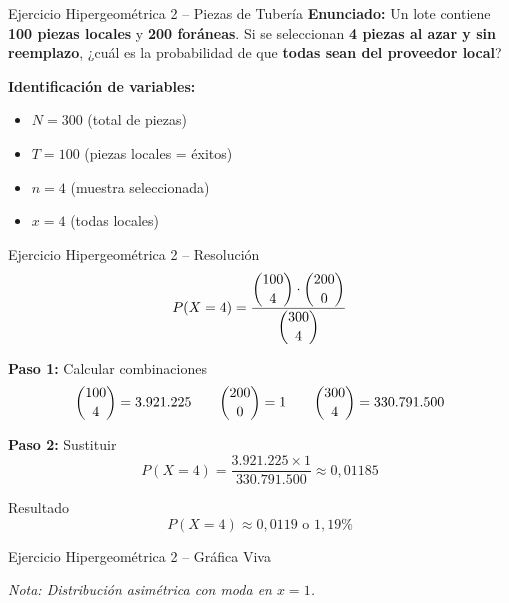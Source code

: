 \documentclass[10pt]{beamer}
\begin{document}
\begin{frame}{Ejercicio Hipergeométrica 2 -- Piezas de Tubería}
\textbf{Enunciado:}
\justifying
Un lote contiene \textbf{100 piezas locales} y \textbf{200 foráneas}. Si se seleccionan \textbf{4 piezas al azar y sin reemplazo}, ¿cuál es la probabilidad de que \textbf{todas sean del proveedor local}?

\vspace{0.2cm}
\textbf{Identificación de variables:}
\begin{itemize}
    \item $N = 300$ (total de piezas)
    \item $T = 100$ (piezas locales = éxitos)
    \item $n = 4$ (muestra seleccionada)
    \item $x = 4$ (todas locales)
\end{itemize}
\end{frame}

\begin{frame}{Ejercicio Hipergeométrica 2 -- Resolución}
\[
P(X=4) = \frac{\dbinom{100}{4} \cdot \dbinom{200}{0}}{\dbinom{300}{4}}
\]

\textbf{Paso 1:} Calcular combinaciones
\[
\dbinom{100}{4} = 3.921.225 \qquad \dbinom{200}{0} = 1 \qquad \dbinom{300}{4} = 330.791.500
\]

\textbf{Paso 2:} Sustituir
\[
P(X=4) = \frac{3.921.225 \times 1}{330.791.500} \approx 0,01185
\]

\begin{block}{Resultado}
\[
\boxed{P(X=4) \approx 0,0119 \text{ o } 1,19\%}
\]
\end{block}
\end{frame}

\begin{frame}{Ejercicio Hipergeométrica 2 -- Gráfica Viva}
\begin{center}
\end{center}
\footnotesize
\textit{Nota: Distribución asimétrica con moda en $x=1$.}
\end{frame}
\end{document}
